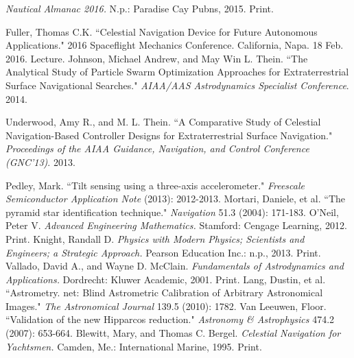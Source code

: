 \documentclass[12pt,a4paper]{book}
\begin{document}
\begin{thebibliography}{100}
 \textit{Nautical Almanac 2016.} N.p.: Paradise Cay Pubns, 2015. Print.

Fuller, Thomas C.K. ``Celestial Navigation Device for Future Autonomous Applications." 2016 Spaceflight Mechanics Conference. California, Napa. 18 Feb. 2016. Lecture.
 Johnson, Michael Andrew, and May Win L. Thein. ``The Analytical Study of Particle Swarm Optimization Approaches for Extraterrestrial Surface Navigational Searches." \textit{AIAA/AAS Astrodynamics Specialist Conference}. 2014.

 Underwood, Amy R., and M. L. Thein. ``A Comparative Study of Celestial Navigation-Based Controller Designs for Extraterrestrial Surface Navigation." \textit{Proceedings of the AIAA Guidance, Navigation, and Control Conference (GNC’13)}. 2013.



Pedley, Mark. ``Tilt sensing using a three-axis accelerometer." \textit{Freescale Semiconductor Application Note} (2013): 2012-2013.
Mortari, Daniele, et al. ``The pyramid star identification technique." \textit{Navigation} 51.3 (2004): 171-183.
O'Neil, Peter V. \textit{Advanced Engineering Mathematics.} Stamford: Cengage Learning, 2012. Print.
Knight, Randall D. \textit{Physics with Modern Physics; Scientists and Engineers; a Strategic Approach.} Pearson Education Inc.: n.p., 2013. Print.
Vallado, David A., and Wayne D. McClain. \textit{Fundamentals of Astrodynamics and Applications.} Dordrecht: Kluwer Academic, 2001. Print.
Lang, Dustin, et al. ``Astrometry. net: Blind Astrometric Calibration of Arbitrary Astronomical Images." \textit{The Astronomical Journal} 139.5 (2010): 1782.
Van Leeuwen, Floor. ``Validation of the new Hipparcos reduction." \textit{Astronomy \& Astrophysics} 474.2 (2007): 653-664.
Blewitt, Mary, and Thomas C. Bergel. \textit{Celestial Navigation for Yachtsmen.} Camden, Me.: International Marine, 1995. Print.


\end{thebibliography}
\end{document}
